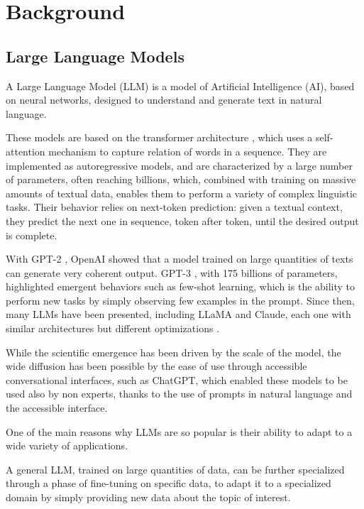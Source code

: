 \section{Background}
\label{sec:background}


\subsection{Large Language Models}
A Large Language Model (LLM) is a model of Artificial Intelligence (AI), based on neural networks, designed to understand and generate text in natural language.

These models are based on the transformer architecture \cite{vaswani2023attentionneed}, which uses a self-attention mechanism to capture relation of words in a sequence.
They are implemented as autoregressive models, and are characterized by a large number of parameters, often reaching billions, which, combined with training on massive amounts of textual data, enables them to perform a variety of complex linguistic tasks.
Their behavior relies on next-token prediction: given a textual context, they predict the next one in sequence, token after token, until the desired output is complete.

\medskip
With GPT-2 \cite{radford2019language}, OpenAI showed that a model trained on large quantities of texts can generate very coherent output.
GPT-3 \cite{brown2020LMfewshot}, with 175 billions of parameters, highlighted emergent behaviors such as few-shot learning, which is the ability to perform new tasks by simply observing few examples in the prompt.
Since then, many LLMs have been presented, including LLaMA and Claude, each one with similar architectures but different optimizations \cite{wang2025llm}.

While the scientific emergence has been driven by the scale of the model, the wide diffusion has been possible by the ease of use through accessible conversational interfaces, such as ChatGPT, which enabled these models to be used also by non experts, thanks to the use of prompts in natural language and the accessible interface.

\medskip
One of the main reasons why LLMs are so popular is their ability to adapt to a wide variety of applications.

A general LLM, trained on large quantities of data, can be further specialized through a phase of fine-tuning on specific data, to adapt it to a specialized domain by simply providing new data about the topic of interest.

